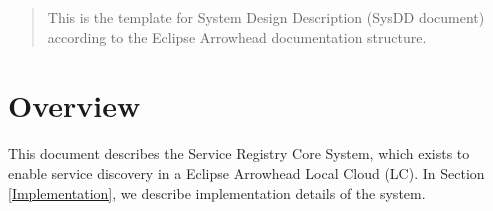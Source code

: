 \documentclass[a4paper]{arrowhead}
\begin{document}
\ArrowheadDate{\today}
\ArrowheadSetup

\begin{center}
  \vspace*{1cm}
  \huge{\arrowtitle}

  \vspace*{0.2cm}
  \LARGE{\arrowtype}
  \vspace*{1cm}

  \vspace*{\fill}


  \vspace*{1cm}
  \vspace*{\fill}

  \begin{abstract}
    This is the template for System Design Description (SysDD document)
    according to the Eclipse Arrowhead documentation structure. 
  \end{abstract}

  \vspace*{1cm}

 \end{center}

\newpage

\tableofcontents
\newpage

\section{Overview}
\label{sec:overview}
\color{black}
This document describes the Service Registry Core System, which exists to enable service discovery in a Eclipse Arrowhead Local Cloud (LC). In Section \ref{Implementation}, we describe implementation details of the system.
\end{document}
